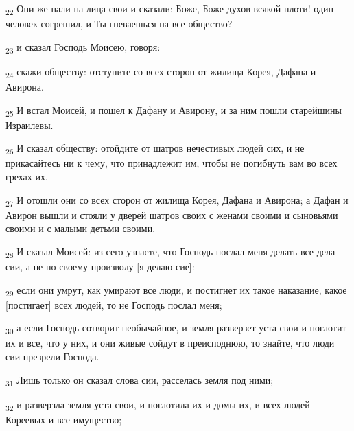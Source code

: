 \begin{tcolorbox}
\textsubscript{22} Они же пали на лица свои и сказали: Боже, Боже духов всякой плоти! один человек согрешил, и Ты гневаешься на все общество?
\end{tcolorbox}
\begin{tcolorbox}
\textsubscript{23} и сказал Господь Моисею, говоря:
\end{tcolorbox}
\begin{tcolorbox}
\textsubscript{24} скажи обществу: отступите со всех сторон от жилища Корея, Дафана и Авирона.
\end{tcolorbox}
\begin{tcolorbox}
\textsubscript{25} И встал Моисей, и пошел к Дафану и Авирону, и за ним пошли старейшины Израилевы.
\end{tcolorbox}
\begin{tcolorbox}
\textsubscript{26} И сказал обществу: отойдите от шатров нечестивых людей сих, и не прикасайтесь ни к чему, что принадлежит им, чтобы не погибнуть вам во всех грехах их.
\end{tcolorbox}
\begin{tcolorbox}
\textsubscript{27} И отошли они со всех сторон от жилища Корея, Дафана и Авирона; а Дафан и Авирон вышли и стояли у дверей шатров своих с женами своими и сыновьями своими и с малыми детьми своими.
\end{tcolorbox}
\begin{tcolorbox}
\textsubscript{28} И сказал Моисей: из сего узнаете, что Господь послал меня делать все дела сии, а не по своему произволу [я делаю сие]:
\end{tcolorbox}
\begin{tcolorbox}
\textsubscript{29} если они умрут, как умирают все люди, и постигнет их такое наказание, какое [постигает] всех людей, то не Господь послал меня;
\end{tcolorbox}
\begin{tcolorbox}
\textsubscript{30} а если Господь сотворит необычайное, и земля разверзет уста свои и поглотит их и все, что у них, и они живые сойдут в преисподнюю, то знайте, что люди сии презрели Господа.
\end{tcolorbox}
\begin{tcolorbox}
\textsubscript{31} Лишь только он сказал слова сии, расселась земля под ними;
\end{tcolorbox}
\begin{tcolorbox}
\textsubscript{32} и разверзла земля уста свои, и поглотила их и домы их, и всех людей Кореевых и все имущество;
\end{tcolorbox}
